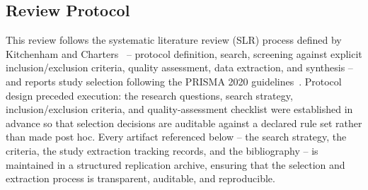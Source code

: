 %

\subsection{Review Protocol}
\label{subsec:review-protocol}
This review follows the systematic literature review (SLR) process
defined by Kitchenham and Charters~\cite{kitchenham2007} -- protocol
definition, search, screening against explicit inclusion/exclusion
criteria, quality assessment, data extraction, and synthesis -- and
reports study selection following the PRISMA 2020
guidelines~\cite{page2021prisma}. Protocol design preceded execution: the
research questions, search strategy, inclusion/exclusion criteria, and
quality-assessment checklist were established in advance so
that selection decisions are auditable against a declared rule set
rather than made post hoc. Every artifact referenced below -- the
search strategy, the criteria, the study extraction tracking records, and
the bibliography -- is maintained in a structured replication archive,
ensuring that the selection and extraction process is transparent,
auditable, and reproducible.

